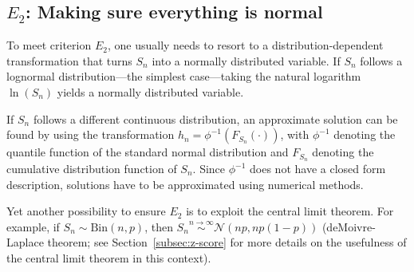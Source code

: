 \subsection{\texorpdfstring{$E_2$}{E2}: Making sure everything is normal}
\label{subsec:normal_transformation}
To meet criterion $E_2$, one usually needs to resort to a distribution-dependent transformation that turns $S_n$ into a normally distributed variable. If $S_n$ follows a lognormal distribution---the simplest case---taking the natural logarithm $\ln(S_n)$ yields a normally distributed variable.\par
If $S_n$ follows a different continuous distribution, an approximate solution can be found by using the transformation $h_n = \phi^{-1}(F_{S_n}(\cdot))$, with $\phi^{-1}$ denoting the quantile function of the standard normal distribution and $F_{S_n}$ denoting the cumulative distribution function of $S_n$. Since $\phi^{-1}$ does not have a closed form description, solutions have to be approximated using numerical methods.\par
Yet another possibility to ensure $E_2$ is to exploit the central limit theorem. For example, if $S_n\sim \text{Bin}(n,p)$, then $S_n \overset{n\rightarrow\infty}{\sim}\mathcal{N}(np,np(1-p))$ (deMoivre-Laplace theorem; see Section~\ref{subsec:z-score} for more details on the usefulness of the central limit theorem in this context).\par

